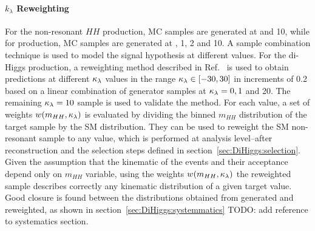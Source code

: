 \paragraph{$k_\lambda$ Reweighting}
For the \ggH non-resonant $HH$ production, MC samples are generated at  and 10, 
while for \VBFH production, 
MC samples are generated at , 1, 2 and 10. 
A sample combination technique is used to model the signal hypothesis at different \kl values.
For the \ggH di-Higgs production, 
a reweighting method described in Ref.~\cite{ATL-PHYS-PUB-2019-007} 
is used to obtain predictions at different $\kappa_{\lambda}$ values 
in the range $\kappa_{\lambda} \in \left[-30, 30 \right] $ 
in increments of 0.2 based on a linear combination of 
generator samples at $\kappa_{\lambda}=0, 1$ and 20. 
The remaining $\kappa_{\lambda} = 10$ sample is used to validate the method.
For each \kl value, a set of weights $w(m_{HH},\kappa_{\lambda})$ is evaluated 
by dividing the binned $m_{HH}$ distribution of the \kl target sample 
by the SM distribution. 
They can be used to reweight the SM non-resonant sample to any \kl value,
which is performed at analysis level--after reconstruction and the selection steps
defined in section~\ref{sec:DiHiggs:selection}. 
Given the assumption that the kinematic of the \ggH events 
and their acceptance depend only on $m_{HH}$ variable, 
using the weights $w(m_{HH},\kappa_{\lambda})$ the reweighted sample describes correctly any kinematic distribution of a given target \kl value. 
Good closure is found between the distributions obtained from \kl generated and reweighted, 
as shown in section~\ref{sec:DiHiggs:systemmatics} TODO: add reference to systematics section.

